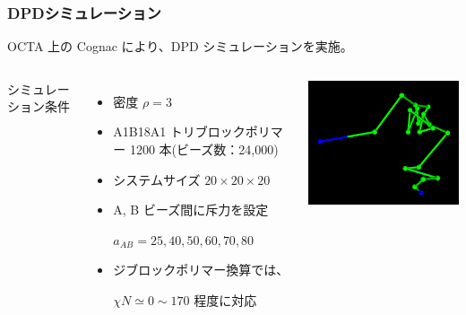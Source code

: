 \documentclass[12pt, dvipdfmx]{beamer}
\begin{document}
\begin{frame}
\frametitle{DPDシミュレーション}

OCTA 上の Cognac により、DPD シミュレーションを実施。

\begin{columns}[T, totalwidth=0.96\linewidth]

シミュレーション条件
	\begin{itemize}
	\item
	密度 $\rho =3$
	\item
	A1B18A1 トリブロックポリマー 1200 本(ビーズ数：24,000)
	\item
	システムサイズ $20\times20\times20$
	\item
	A, B ビーズ間に斥力を設定

	$a_{AB} = 25, 40, 50, 60, 70, 80$
	\item
	ジブロックポリマー換算では、

	$\chi N \simeq 0 \sim 170$ 程度に対応
	\end{itemize}

\includegraphics[width=\columnwidth]{./fig/polymer.png}


\end{columns}
\end{frame}
\end{document}

